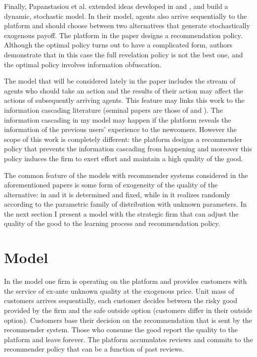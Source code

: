 \documentclass[a4paper]{article}
\begin{document}
	
	
	Finally, Papanstasiou et al. \cite{papanastasiou2017} extended ideas developed in \cite{kremer2014} and \cite{che2015}, and build a dynamic, stochastic model. In their model, agents also arrive sequentially to the platform and should choose between two alternatives that generate stochastically exogenous payoff. The platform in the paper designs a recommendation policy. Although the optimal policy turns out to have a complicated form, authors demonstrate that in this case the full revelation policy is not the best one, and the optimal policy involves information obfuscation.
	
	
	
	The model that will be considered lately in the paper includes the stream of agents who should take an action and the results of their action may affect the actions of subsequently arriving agents. This feature may links this work to the information cascading literature (seminal papers are those of \cite{banerjee1992simple} and \cite{bikhchandani1992theory}). The information cascading in my model may happen if the platform reveals the information of the previous users' experience to the newcomers. However the scope of this work is completely different: the platform designs a recommender policy that prevents the information cascading from happening and moreover this policy induces the firm to exert effort and maintain a high quality of the good.
	
	
	
	The common feature of the models with recommender systems considered in the aforementioned papers is some form of exogeneity of the quality of the alternative: in \cite{kremer2014} and \cite{che2015} it is determined and fixed, while in \cite{papanastasiou2017} it realizes randomly according to the parametric family of distribution with unknown parameters. In the next section I present a model with the strategic firm that can adjust the quality of the good to the learning process and recommendation policy.
	
	\section{Model}
	In the model one firm is operating on the platform and provides customers with the service of ex-ante unknown quality at the exogenous price. Unit mass of customers arrives sequentially, each customer decides between the risky good provided by the firm and the safe outside option (customers differ in their outside option). Customers base their decision on the recommendation that is sent by the recommender system. Those who consume the good report the quality to the platform and leave forever. The platform accumulates reviews and commits to the recommender policy that can be a function of past reviews.
	
\end{document}
